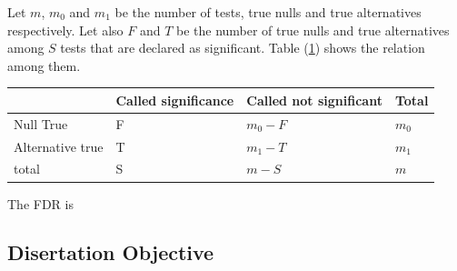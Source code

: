 Let $m$,  $m_0$  and $m_1$ be the number of tests,  true nulls  and true alternatives respectively.
Let also $F$ and $T$ be the number of true nulls and true alternatives among $S$ tests that are
declared as significant. Table (\ref{table1}) shows the  relation among them. 
\begin{table}[h]\label{table1}\begin{center}
		\begin{tabular}{llll}
			& Called significance & Called not significant & Total  \\ \hline
			Null True &F &$m_0-F$  & $m_0$  \\
			Alternative true & T  & $m_1 -T$  & $m_1$  \\
			total & S & $m-S$  & $m$ \\ \hline
		\end{tabular}\end{center}
	\end{table} 
	The FDR is 
	
	\subsection{Disertation Objective}
	
	
	
